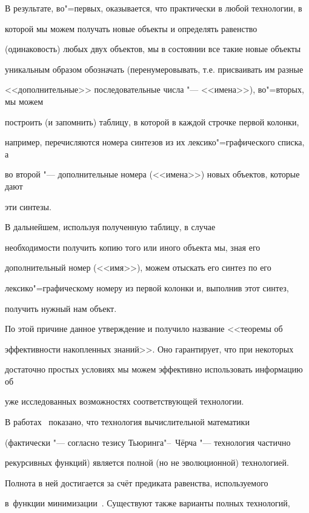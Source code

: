 \smallskip



В результате, во"=первых, оказывается, что практически в любой технологии, в

которой мы можем получать новые объекты и определять равенство

(одинаковость) любых двух объектов, мы в состоянии все такие новые объекты

уникальным образом обозначать (перенумеровывать, т.е. присваивать им разные

<<дополнительные>> последовательные числа "--- <<имена>>), во"=вторых, мы можем

построить (и запомнить) таблицу, в которой в каждой строчке первой колонки,

например, перечисляются номера синтезов из их лексико"=графического списка, а

во второй "--- дополнительные номера (<<имена>>) новых объектов, которые дают

эти синтезы. 

В дальнейшем, используя полученную таблицу, в случае

необходимости получить копию того или иного объекта мы, зная его

дополнительный номер (<<имя>>), можем отыскать его синтез по его

лексико"=графическому номеру из первой колонки и, выполнив этот синтез,

получить нужный нам объект.



По этой причине данное утверждение и получило название <<теоремы об

эффективности накопленных знаний>>. Оно гарантирует, что при некоторых

достаточно простых условиях мы можем эффективно использовать информацию об

уже исследованных возможностях соответствующей технологии.



В работах~\cite{krylov:bib3,krylov:bib6} показано, что технология вычислительной математики

(фактически "--- согласно тезису Тьюринга"--~Чёрча "--- технология частично

рекурсивных функций) является полной (но не эволюционной) технологией.

Полнота в ней достигается за счёт предиката равенства, используемого

\linebreak в~функции минимизации~\cite{krylov:bib3,krylov:bib6,krylov:bib13}. Существуют также варианты полных технологий,

